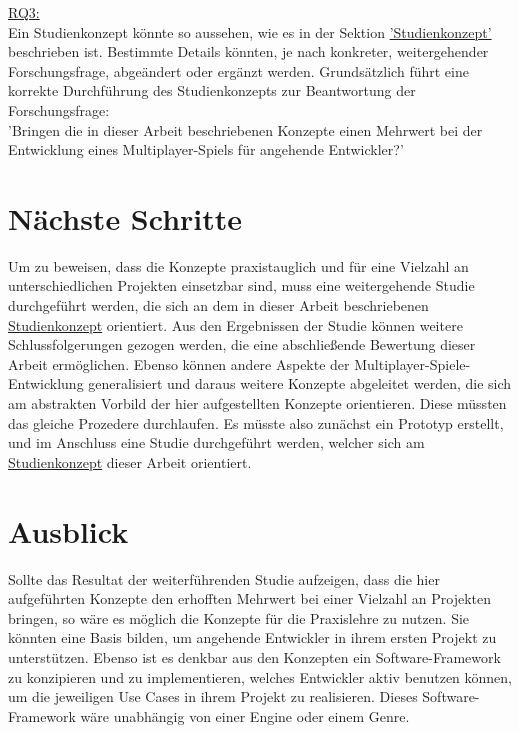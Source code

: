 \hyperref[RQ3]{RQ3:} \\
Ein Studienkonzept könnte so aussehen, wie es in der Sektion \hyperref[studienkonzept]{'Studienkonzept'} beschrieben ist. Bestimmte Details könnten, je nach konkreter, weitergehender Forschungsfrage, abgeändert oder ergänzt werden. Grundsätzlich führt eine korrekte Durchführung des Studienkonzepts zur Beantwortung der Forschungsfrage: \\
'Bringen die in dieser Arbeit beschriebenen Konzepte einen Mehrwert bei der Entwicklung eines Multiplayer-Spiels für angehende Entwickler?'

\section{Nächste Schritte}

Um zu beweisen, dass die Konzepte praxistauglich und für eine Vielzahl an unterschiedlichen Projekten einsetzbar sind, muss eine weitergehende Studie durchgeführt werden, die sich an dem in dieser Arbeit beschriebenen \hyperref[studienkonzept]{Studienkonzept} orientiert. Aus den Ergebnissen der Studie können weitere Schlussfolgerungen gezogen werden, die eine abschließende Bewertung dieser Arbeit ermöglichen. Ebenso können andere Aspekte der Multiplayer-Spiele-Entwicklung generalisiert und daraus weitere Konzepte abgeleitet werden, die sich am abstrakten Vorbild der hier aufgestellten Konzepte orientieren. Diese müssten das gleiche Prozedere durchlaufen. Es müsste also zunächst ein Prototyp erstellt, und im Anschluss eine Studie durchgeführt werden, welcher sich am \hyperref[studienkonzept]{Studienkonzept} dieser Arbeit orientiert.

\section{Ausblick}

Sollte das Resultat der weiterführenden Studie aufzeigen, dass die hier aufgeführten Konzepte den erhofften Mehrwert bei einer Vielzahl an Projekten bringen, so wäre es möglich die Konzepte für die Praxislehre zu nutzen. Sie könnten eine Basis bilden, um angehende Entwickler in ihrem ersten Projekt zu unterstützen. Ebenso ist es denkbar aus den Konzepten ein Software-Framework zu konzipieren und zu implementieren, welches Entwickler aktiv benutzen können, um die jeweiligen Use Cases in ihrem Projekt zu realisieren. Dieses Software-Framework wäre unabhängig von einer Engine oder einem Genre.